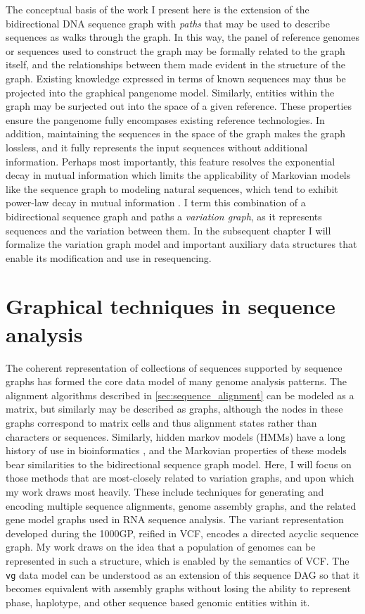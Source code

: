 The conceptual basis of the work I present here is the extension of the bidirectional DNA sequence graph with \emph{paths} that may be used to describe sequences as walks through the graph.
In this way, the panel of reference genomes or sequences used to construct the graph may be formally related to the graph itself, and the relationships between them made evident in the structure of the graph.
Existing knowledge expressed in terms of known sequences may thus be projected into the graphical pangenome model.
Similarly, entities within the graph may be surjected out into the space of a given reference.
These properties ensure the pangenome fully encompases existing reference technologies.
In addition, maintaining the sequences in the space of the graph makes the graph lossless, and it fully represents the input sequences without additional information.
Perhaps most importantly, this feature resolves the exponential decay in mutual information which limits the applicability of Markovian models like the sequence graph to modeling natural sequences, which tend to exhibit power-law decay in mutual information \cite{lin2017critical}.
I term this combination of a bidirectional sequence graph and paths a \emph{variation graph}, as it represents sequences and the variation between them.
In the subsequent chapter I will formalize the variation graph model and important auxiliary data structures that enable its modification and use in resequencing.

\section{Graphical techniques in sequence analysis}

The coherent representation of collections of sequences supported by sequence graphs has formed the core data model of many genome analysis patterns.
The alignment algorithms described in \ref{sec:sequence_alignment} can be modeled as a matrix, but similarly may be described as graphs, although the nodes in these graphs correspond to matrix cells and thus alignment states rather than characters or sequences.
Similarly, hidden markov models (HMMs) have a long history of use in bioinformatics \cite{durbin1998biological}, and the Markovian properties of these models bear similarities to the bidirectional sequence graph model.
Here, I will focus on those methods that are most-closely related to variation graphs, and upon which my work draws most heavily.
These include techniques for generating and encoding multiple sequence alignments, genome assembly graphs, and the related gene model graphs used in RNA sequence analysis.
The variant representation developed during the 1000GP, reified in VCF, encodes a directed acyclic sequence graph.
My work draws on the idea that a population of genomes can be represented in such a structure, which is enabled by the semantics of VCF.
The {\tt vg} data model can be understood as an extension of this sequence DAG so that it becomes equivalent with assembly graphs without losing the ability to represent phase, haplotype, and other sequence based genomic entities within it.

